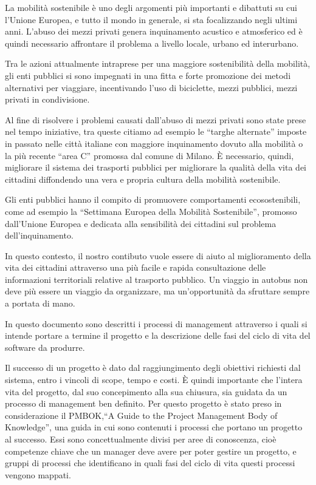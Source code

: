 La mobilit\`{a} sostenibile \`{e} uno degli argomenti pi\`{u} importanti e dibattuti su cui l\rq Unione Europea, e tutto il mondo in generale, si sta focalizzando negli ultimi anni. L\rq abuso dei mezzi privati genera inquinamento acustico e atmosferico ed \`{e} quindi necessario affrontare il problema a livello locale, urbano ed interurbano. 

Tra le azioni attualmente intraprese per una maggiore sostenibilit\`{a} della mobilit\`{a}, gli enti pubblici si sono impegnati in una fitta e forte promozione dei metodi alternativi per viaggiare, incentivando l\rq uso di biciclette, mezzi pubblici, mezzi privati in condivisione. 

Al fine di risolvere i problemi causati dall\rq abuso di mezzi privati sono state prese nel tempo iniziative, tra queste citiamo ad esempio le ``targhe alternate'' imposte in passato nelle citt\`{a} italiane con maggiore inquinamento dovuto alla mobilit\`{a} o la pi\`{u} recente ``area C'' promossa dal comune di Milano. \`{E} necessario, quindi, migliorare il sistema dei trasporti pubblici per migliorare la qualit\`{a} della vita dei cittadini diffondendo una vera e propria cultura della mobilit\`{a} sostenibile.

Gli enti pubblici hanno il compito di promuovere comportamenti ecosostenibili, come ad esempio la ``Settimana Europea della Mobilit\`{a} Sostenibile'', promosso dall\rq Unione Europea e dedicata alla sensibilit\`{a} dei cittadini sul problema dell\rq inquinamento.

In questo contesto, il nostro contibuto vuole essere di aiuto al miglioramento della vita dei cittadini attraverso una pi\`{u} facile e rapida consultazione delle informazioni territoriali relative al trasporto pubblico. Un viaggio in autobus non deve pi\`{u} essere un viaggio da organizzare, ma un\rq opportunit\`{a} da sfruttare sempre a portata di mano. 

In questo documento sono descritti i processi di management attraverso i quali si intende portare a termine il progetto e la descrizione delle fasi del ciclo di vita del software da produrre. 

Il successo di un progetto \`{e} dato dal raggiungimento degli obiettivi richiesti dal sistema, entro i vincoli di scope, tempo e costi. \`{E} quindi importante che l\rq intera vita del progetto, dal suo concepimento alla sua chiusura, sia guidata da un processo di management ben definito. Per questo progetto \`{e} stato preso in considerazione il PMBOK,``A Guide to the Project Management Body of Knowledge'', una guida in cui sono contenuti i processi che portano un progetto al successo. Essi sono concettualmente divisi per aree di conoscenza, cio\`{e} competenze chiave che un manager deve avere per poter gestire un progetto, e gruppi di processi che identificano in quali fasi del ciclo di vita questi processi vengono mappati. 

